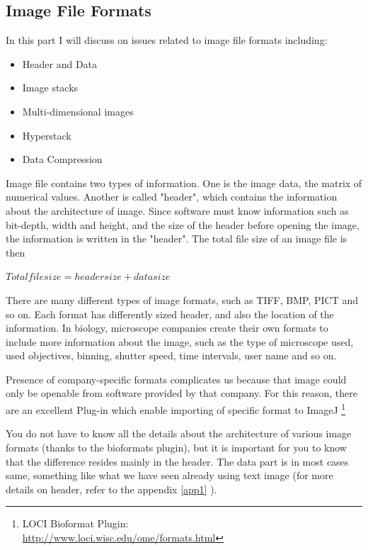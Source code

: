 \subsection{Image File Formats}

In this part I will discuss on issues related to image file formats including:

\begin{itemize}
	\item Header and Data
	\item Image stacks
	\item Multi-dimensional images
	\item Hyperstack
	\item Data Compression
\end{itemize}

Image file contains two types of information. 
One is the image data, the matrix of numerical values. 
Another is called "header", which contains the information about the architecture of image. 
Since software must know information such as bit-depth, width and height, and the size of 
the header before opening the image, the information is written in the "header". 
The total file size of an image file is then 

$Total file size = header size + data size$

There are many different types of image formats, such as TIFF, BMP, PICT and so
on. Each format has differently sized header, and also the location of the
information. In biology, microscope companies create their own formats to
include more information about the image, such as the type of microscope used,
used objectives, binning, shutter speed, time intervals, user name and so on.

Presence of company-specific formats complicates us because that image could
only be openable from software provided by that company. For this reason, there
are an excellent Plug-in which enable importing of specific format to ImageJ
\footnote{\tab LOCI Bioformat Plugin:\\
\url{http://www.loci.wisc.edu/ome/formats.html}}

You do not have to know all the details about the architecture of various image
formats (thanks to the bioformats plugin), but it is important for you to know
that the difference resides mainly in the header. The data part is in most cases
same, something like what we have seen already using text image (for more
details on header, refer to the appendix \ref{app1} ).

